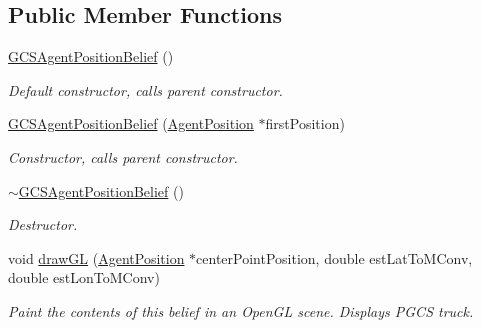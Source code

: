\subsection*{Public Member Functions}
\begin{DoxyCompactItemize}
\item 
\hypertarget{class_g_c_s_agent_position_belief_ad5e7c4c06e8be7a26d76e688e0cc2656}{
\hyperlink{class_g_c_s_agent_position_belief_ad5e7c4c06e8be7a26d76e688e0cc2656}{GCSAgentPositionBelief} ()}
\label{class_g_c_s_agent_position_belief_ad5e7c4c06e8be7a26d76e688e0cc2656}

\begin{DoxyCompactList}\small\item\em Default constructor, calls parent constructor. \end{DoxyCompactList}\item 
\hyperlink{class_g_c_s_agent_position_belief_aa1e5147ed3e89f1fe4ae68abfc5d3a4b}{GCSAgentPositionBelief} (\hyperlink{class_agent_position}{AgentPosition} $\ast$firstPosition)
\begin{DoxyCompactList}\small\item\em Constructor, calls parent constructor. \end{DoxyCompactList}\item 
\hypertarget{class_g_c_s_agent_position_belief_a18e062448cdcd24775d059bffa17cb3f}{
\hyperlink{class_g_c_s_agent_position_belief_a18e062448cdcd24775d059bffa17cb3f}{$\sim$GCSAgentPositionBelief} ()}
\label{class_g_c_s_agent_position_belief_a18e062448cdcd24775d059bffa17cb3f}

\begin{DoxyCompactList}\small\item\em Destructor. \end{DoxyCompactList}\item 
void \hyperlink{class_g_c_s_agent_position_belief_a148cf93f40d6a0517c4cd02f714b443a}{drawGL} (\hyperlink{class_agent_position}{AgentPosition} $\ast$centerPointPosition, double estLatToMConv, double estLonToMConv)
\begin{DoxyCompactList}\small\item\em Paint the contents of this belief in an OpenGL scene. Displays PGCS truck. \end{DoxyCompactList}\end{DoxyCompactItemize}
